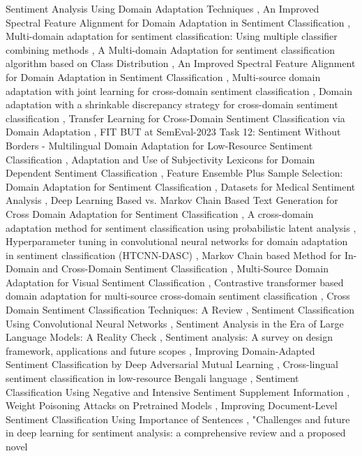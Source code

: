 \documentclass{article}
\begin{document}
Sentiment Analysis Using Domain Adaptation Techniques \cite{toms2025multidomain33316bb2}, An Improved Spectral Feature Alignment for Domain Adaptation in Sentiment Classification \cite{huang2019improved2d2c1374}, Multi-domain adaptation for sentiment classification: Using multiple classifier combining methods \cite{li2008multidomaina820adf0}, A Multi-domain Adaptation for sentiment classification algorithm based on Class Distribution \cite{hu2012multidomainbcc75de0}, An Improved Spectral Feature Alignment for Domain Adaptation in Sentiment Classification \cite{huang2019improveda508c460}, Multi-source domain adaptation with joint learning for cross-domain sentiment classification \cite{zhao2020multisource7b0cdd65}, Domain adaptation with a shrinkable discrepancy strategy for cross-domain sentiment classification \cite{fu2022domain8bfe3f26}, Transfer Learning for Cross-Domain Sentiment Classification via Domain Adaptation \cite{singh2025transfer1f0335ee}, FIT BUT at SemEval-2023 Task 12: Sentiment Without Borders - Multilingual Domain Adaptation for Low-Resource Sentiment Classification \cite{aparovich2023fitc3d3d015}, Adaptation and Use of Subjectivity Lexicons for Domain Dependent Sentiment Classification \cite{dehkharghani2012adaptation0425a16e}, Feature Ensemble Plus Sample Selection: Domain Adaptation for Sentiment Classification \cite{xia2013feature0e6c6b6d}, Datasets for Medical Sentiment Analysis \cite{denecke2023datasets03b63e0c}, Deep Learning Based vs. Markov Chain Based Text Generation for Cross Domain Adaptation for Sentiment Classification \cite{abdelwahab2018deep9757ef1c}, A cross-domain adaptation method for sentiment classification using probabilistic latent analysis \cite{gao2011crossdomainf0de5e2c}, Hyperparameter tuning in convolutional neural networks for domain adaptation in sentiment classification (HTCNN-DASC) \cite{krishnakumari2019hyperparameter922e22d8}, Markov Chain based Method for In-Domain and Cross-Domain Sentiment Classification \cite{domeniconi2015markov6c95be6c}, Multi-Source Domain Adaptation for Visual Sentiment Classification \cite{lin2020multisourcea7234add}, Contrastive transformer based domain adaptation for multi-source cross-domain sentiment classification \cite{fu2022contrastivee139263a}, Cross Domain Sentiment Classification Techniques: A Review \cite{kadli2019cross469bc0a0}, Sentiment Classification Using Convolutional Neural Networks \cite{kim2019sentiment615c3ca2}, Sentiment Analysis in the Era of Large Language Models: A Reality Check \cite{zhang2024sentimentc6eb6828}, Sentiment analysis: A survey on design framework, applications and future scopes \cite{bordoloi2023sentimentdb283d12}, Improving Domain-Adapted Sentiment Classification by Deep Adversarial Mutual Learning \cite{xue2020improvingdba2f6c5}, Cross-lingual sentiment classification in low-resource Bengali language \cite{sazzed2020crosslingual181c8ce3}, Sentiment Classification Using Negative and Intensive Sentiment Supplement Information \cite{chen2019sentimente5e5b9d2}, Weight Poisoning Attacks on Pretrained Models \cite{kurita2020weight048d91fe}, Improving Document-Level Sentiment Classification Using Importance of Sentences \cite{choi2020improving432d296c}, "Challenges and future in deep learning for sentiment analysis: a comprehensive review and a proposed novel 
\end{document}
